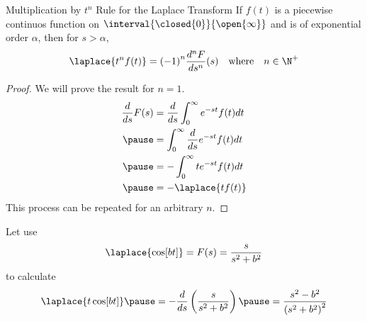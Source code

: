 \documentclass{beamer}
\begin{document}
\begin{frame}
\begin{block}{Multiplication by $t^n$ Rule for the Laplace Transform}
If $f(t)$ is a piecewise continuos function on $\interval{\closed{0}}{\open{\infty}}$ and is of exponential order $\alpha$, then for $s>\alpha$,
\begin{equation*}
\laplace\{t^n f(t)\}={(-1)}^n\dfrac{d^n F}{d s^n}(s)
\quad\text{where}\quad n\in\N^+
\end{equation*}
\end{block}\pause
\begin{proof}
We will prove the result for $n=1$. 
\begin{equation*}
\begin{aligned}
\dfrac{d}{ds} F(s) &= \dfrac{d}{ds}\int_0^\infty e^{-st} f(t) dt \\\pause
&=\int_0^\infty \dfrac{d}{ds} e^{-st} f(t) dt \\\pause
&=-\int_0^\infty t e^{-st} f(t) dt\\\pause
&=-\laplace\{t f(t)\}
\end{aligned}
\end{equation*}
This process can be repeated for an arbitrary $n$.
\end{proof}
\end{frame}

\begin{frame}
\begin{example}
Let use 
\begin{equation*}
\laplace\{\cos[bt]\}=F(s)=\dfrac{s}{s^2+b^2}
\end{equation*}\pause
to calculate
\begin{equation*}
\laplace\{t\cos[bt]\}\pause
=-\dfrac{d}{ds}\left(\dfrac{s}{s^2+b^2}\right)\pause
=\dfrac{s^2-b^2}{{(s^2+b^2)}^2}
\end{equation*}
\end{example}
\end{frame}
\end{document}
